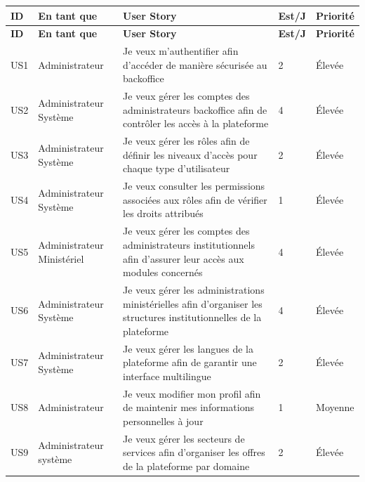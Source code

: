\renewcommand{\arraystretch}{1.2}

\begin{longtable}{|p{1cm}|p{3cm}|p{6.5cm}|p{1.5cm}|p{2cm}|}

\hline
\rowcolor{orange!30}
\textbf{ID} & \textbf{En tant que} & \textbf{User Story} & \textbf{Est/J} & \textbf{Priorité} \\
\hline
\endfirsthead

\hline
\rowcolor{orange!30}
\textbf{ID} & \textbf{En tant que} & \textbf{User Story} & \textbf{Est/J} & \textbf{Priorité} \\
\hline
\endhead



US1 & Administrateur & Je veux m'authentifier afin d'accéder de manière sécurisée au backoffice & 2 & Élevée \\ \hline
US2 & Administrateur Système & Je veux gérer les comptes des administrateurs backoffice afin de contrôler les accès à la plateforme & 4 & Élevée \\ \hline
US3 & Administrateur Système & Je veux gérer les rôles afin de définir les niveaux d'accès pour chaque type d'utilisateur & 2 & Élevée \\ \hline
US4 & Administrateur Système & Je veux consulter les permissions associées aux rôles afin de vérifier les droits attribués & 1 & Élevée \\ \hline
US5 & Administrateur Ministériel & Je veux gérer les comptes des administrateurs institutionnels afin d'assurer leur accès aux modules concernés & 4 & Élevée \\ \hline
US6 & Administrateur Système & Je veux gérer les administrations ministérielles afin d'organiser les structures institutionnelles de la plateforme & 4 & Élevée \\ \hline
US7 & Administrateur Système & Je veux gérer les langues de la plateforme afin de garantir une interface multilingue & 2 & Élevée \\ \hline
US8 & Administrateur & Je veux modifier mon profil afin de maintenir mes informations personnelles à jour & 1 & Moyenne \\ \hline
US9 & Administrateur système & Je veux gérer les secteurs de services afin d'organiser les offres de la plateforme par domaine & 2 & Élevée \\ \hline


\end{longtable}
